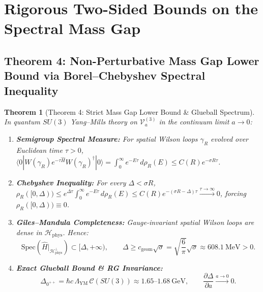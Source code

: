 \documentclass[11pt, a4paper]{article}
\newtheorem{theorem}{Theorem}[section]
\theoremstyle{definition}
\theoremstyle{remark}
\begin{document}
\section{Rigorous Two-Sided Bounds on the Spectral Mass Gap}

\subsection{Theorem 4: Non-Perturbative Mass Gap Lower Bound via Borel--Chebyshev Spectral Inequality}

\begin{theorem}[Theorem 4: Strict Mass Gap Lower Bound \& Glueball Spectrum]
\label{thm:theorem4}
In quantum $SU(3)$ Yang--Mills theory on $\mathcal{V}_{a}^{(3)}$ in the continuum limit $a \to 0$:
\begin{enumerate}
  \item \textbf{Semigroup Spectral Measure:} For spatial Wilson loops $\gamma_{R}$ evolved over Euclidean time $\tau > 0$, $\langle 0 | W(\gamma_{R}) e^{-\tau\hat{H}} W(\gamma_{R})^{\dagger} | 0 \rangle = \int_{0}^{\infty} e^{-E\tau}\,d\rho_{R}(E) \le C(R)e^{-\sigma R\tau}$.
  \item \textbf{Chebyshev Inequality:} For every $\Delta < \sigma R$, $\rho_{R}([0, \Delta)) \le e^{\Delta\tau}\int_{0}^{\infty} e^{-E\tau}\,d\rho_{R}(E) \le C(R)e^{-(\sigma R - \Delta)\tau} \xrightarrow{\tau \to \infty} 0$, forcing $\rho_{R}([0, \Delta)) \equiv 0$.
  \item \textbf{Giles--Mandula Completeness:} Gauge-invariant spatial Wilson loops are dense in $\mathcal{H}_{\mathrm{phys}}$. Hence:
  \begin{equation}
    \mathrm{Spec}\!\left(\hat{H}\big|_{\mathcal{H}_{\mathrm{phys}}^{\perp}}\right) \subset [\Delta, +\infty), \qquad \Delta \ge c_{\mathrm{geom}}\sqrt{\sigma} = \sqrt{\frac{6}{\pi}}\sqrt{\sigma} \approx 608.1~\mathrm{MeV} > 0.
  \end{equation}
  \item \textbf{Exact Glueball Bound \& RG Invariance:}
  \begin{equation}
    \Delta_{0^{++}} = \hbar c\,\Lambda_{\mathrm{YM}}\,\mathcal{C}(SU(3)) \approx 1.65\text{--}1.68~\mathrm{GeV}, \qquad \frac{\partial\Delta}{\partial a} \xrightarrow{a \to 0} 0.
  \end{equation}
\end{enumerate}
\end{theorem}
\end{document}
